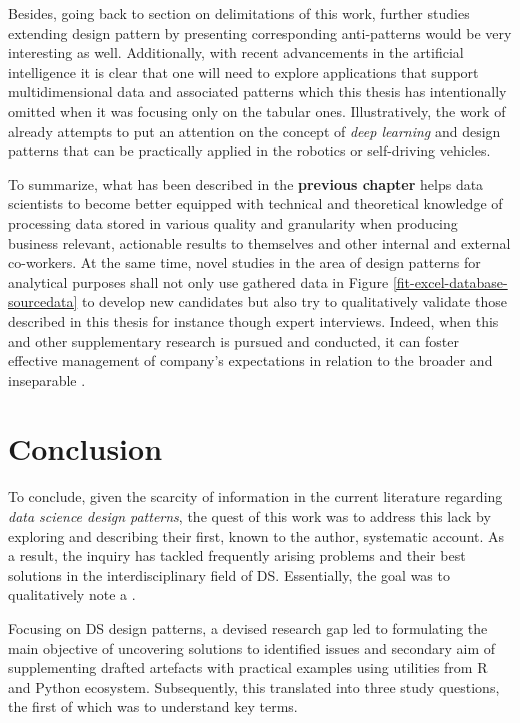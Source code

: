 Besides, going back to section on delimitations of this work, further studies  extending design pattern by presenting corresponding anti-patterns would be very interesting as well.
Additionally, with recent advancements in the artificial intelligence it is clear that one will need to explore applications that support multidimensional data and associated patterns which this thesis has intentionally omitted when it was focusing only on the tabular ones. 
Illustratively, the work of \textcite{PerezBook2017} already attempts to put an attention on the concept of \emph{deep learning} and design patterns that can be practically applied in the robotics or self-driving vehicles.

To summarize, what has been described in the \textbf{previous chapter} helps data scientists to become better equipped with technical and theoretical knowledge of processing data stored in various quality and granularity when producing business relevant, actionable results to themselves and other internal and external co-workers.
At the same time, novel studies in the area of design patterns for analytical purposes shall not only use gathered data in Figure \ref{fit-excel-database-sourcedata} to develop new candidates but also try to qualitatively validate those described in this thesis for instance though expert interviews. 
Indeed, when this and other supplementary research is pursued and conducted, it can foster effective management of company's expectations in relation to the broader and inseparable  \parencite[68]{Bhatt2001}.

\section{Conclusion}
\label{Conclusion}
To conclude, given the scarcity of information in the current literature regarding \emph{data science design patterns}, the quest of this work was to address this lack by exploring and describing their first, known to the author, systematic account. 
As a result, the inquiry has tackled frequently arising problems and their best solutions in the interdisciplinary field of \ac{DS}.
Essentially, the goal was to qualitatively note a  \parencites[10]{Fowler2002}{Schmidt:1996:SP:236156.236164}.

Focusing on \ac{DS} design patterns, a devised research gap led to formulating the main objective of uncovering solutions to identified issues and secondary aim of supplementing drafted artefacts with practical examples using utilities from R and Python ecosystem.
Subsequently, this translated into three study questions, the first of which was to understand key terms.

